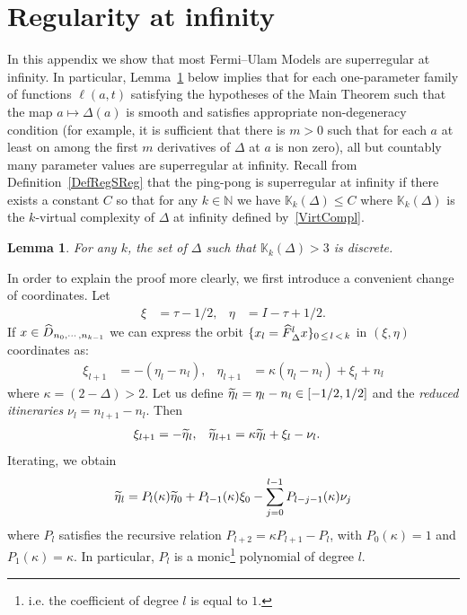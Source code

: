 \documentclass[10pt]{amsart}
\newtheorem{lemm}[theo]{Lemma}\newtheorem{prop}[theo]{Proposition}\newtheorem{coro}[theo]{Corollary}\newtheorem{conj}[theo]{Conjecture}
\theoremstyle{definition}\newtheorem{defi}[theo]{Definition}\newtheorem{rema}[theo]{Remark}\newtheorem{exam}[theo]{Example}\newtheorem{exem}[theo]{Example}\newtheorem{nota}[theo]{Notation}
\newcommand{\bN}{\mathbb{N}}
\newcommand{\LC}{\mathbb{K}}
\newcommand{\hDom}{\hat D}
\newcommand{\nf}{\hat F}
\newcommand{\dn}{\nu}
\newcommand{\teta}{\tilde\eta}
\let\oldtilde\tilde
\renewcommand*{\tilde}[1]{\mathchoice{\widetilde{#1}}{\widetilde{#1}}{\oldtilde{#1}}{\oldtilde{#1}}}
\let\oldhat\hat
\renewcommand*{\hat}[1]{\mathchoice{\widehat{#1}}{\widehat{#1}}{\oldhat{#1}}{\oldhat{#1}}}
\begin{document}
\appendix
\section{Regularity at infinity}\label{AppRegInf}
In this appendix we show that most Fermi--Ulam Models are superregular at infinity. In particular, Lemma~\ref{l_boundedComplexity} below implies that for each one-parameter family of functions $\ell(a, t)$ satisfying the hypotheses of the Main Theorem such that the map $a\mapsto\Delta(a)$ is smooth and satisfies appropriate non-degeneracy condition (for example, it is sufficient that there is $m>0$ such that for each $a$ at least on among the first $m$ derivatives of $\Delta$ at $a$ is non zero), all but countably many parameter values are superregular at infinity. Recall from Definition~\ref{DefRegSReg} that the ping-pong is superregular at infinity if there exists a constant $C$ so that for any $k\in\bN$ we have $\LC_k(\Delta)\le C$ where $\LC_k(\Delta)$ is the $k$-virtual complexity of $\Delta$ at infinity defined by~\eqref{VirtCompl}.

\begin{lemm}\label{l_boundedComplexity}
For any $k$, the set of $\Delta$ such that $\LC_k(\Delta) > 3$ is discrete.
\end{lemm} 

In order to explain the proof more clearly, we first introduce a convenient change of coordinates. Let
\begin{align*}
\xi &= \tau-1/2,&
\eta& = I-\tau+1/2.
\end{align*}
If $x \in \hDom_{n_0,\cdots,n_{k-1}}$ we can express the orbit $\{x_l = \nf_\Delta^lx\}_{0\,\le\,l\,<\,k}$ in $(\xi,\eta)$ coordinates as:
\begin{align*}
\xi_{l+1} &= -(\eta_l-n_l),&
\eta_{l+1}&= \kappa(\eta_l-n_l) +\xi_l + n_l
\end{align*}
where $\kappa = (2-\Delta) > 2$. Let us define $\teta_l = \eta_l-n_l\in[-1/2,1/2]$ and the \emph{reduced itineraries} $\dn_l = n_{l+1}-n_l$. Then
\begin{align}\label{EtaXiForward}
\xi_{l+1} &= -\teta_l,&
\teta_{l+1}&= \kappa\teta_l +\xi_l - \dn_l.
\end{align}
Iterating, we obtain
\begin{align}\label{e_forwardPolynomial}
\teta_l = P_l(\kappa)\teta_0+P_{l-1}(\kappa)\xi_0-\sum_{j= 0}^{l-1}P_{l-j-1}(\kappa)\dn_j
\end{align}
where $P_l$ satisfies the recursive relation $P_{l+2} \!= \!\kappa P_{l+1}- P_l$, with $P_0(\kappa) \!=\! 1$ and $P_1(\kappa) = \kappa$. In particular, $P_l$ is a monic\footnote{ i.e. the coefficient of degree $l$ is equal to $1$.} polynomial of degree $l$.
\end{document}
